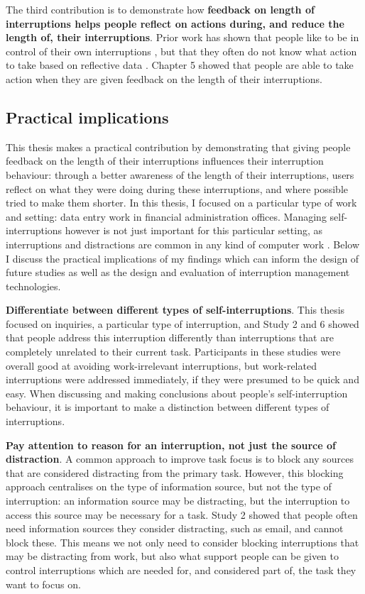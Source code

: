 The third contribution is to demonstrate how \textbf{feedback on length of interruptions helps people reflect on actions during, and reduce the length of, their interruptions}. Prior work has shown that people like to be in control of their own interruptions \citep{Mark2018}, but that they often do not know what action to take based on reflective data \citep{Collins2015, Whittaker2016}. Chapter 5 showed that people are able to take action when they are given feedback on the length of their interruptions.

\subsection{Practical implications}
This thesis makes a practical contribution by demonstrating that giving people feedback on the length of their interruptions influences their interruption behaviour: through a better awareness of the length of their interruptions, users reflect on what they were doing during these interruptions, and where possible tried to make them shorter. In this thesis, I focused on a particular type of work and setting: data entry work in financial administration offices. Managing self-interruptions however is not just important for this particular setting, as interruptions and distractions are common in any kind of computer work \citep{Gonzalez2004}. Below I discuss the practical implications of my findings which can inform the design of future studies as well as the design and evaluation of interruption management technologies. 

\textbf{Differentiate between different types of self-interruptions}. This thesis focused on inquiries, a particular type of interruption, and Study 2 and 6 showed that people address this interruption differently than interruptions that are completely unrelated to their current task. Participants in these studies were overall good at avoiding work-irrelevant interruptions, but work-related interruptions were addressed immediately, if they were presumed to be quick and easy. When discussing and making conclusions about people’s self-interruption behaviour, it is important to make a distinction between different types of interruptions.

\textbf{Pay attention to reason for an interruption, not just the source of distraction}. A common approach to improve task focus is to block any sources that are considered distracting from the primary task. However, this blocking approach centralises on the type of information source, but not the type of interruption: an information source may be distracting, but the interruption to access this source may be necessary for a task. Study 2 showed that people often need information sources they consider distracting, such as email, and cannot block these. This means we not only need to consider blocking interruptions that may be distracting from work, but also what support people can be given to control interruptions which are needed for, and considered part of, the task they want to focus on.

